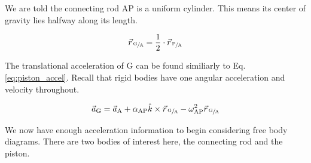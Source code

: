 \documentclass[nofoot,pdf-a,balance,colorlinks,upint,subscriptcorrection,varvw,mathalfa=cal=boondoxo]{asmeconf}
\begin{document}
    We are told the connecting rod AP is a uniform cylinder. This means its center of gravity lies halfway along its length.

    \begin{equation}
        \vec{r}_{\,\sfrac{\textrm{G}}{\textrm{A}}} = \frac{1}{2}\cdot \vec{r}_{\,\sfrac{\textrm{P}}{\textrm{A}}}
    \end{equation}

    The translational acceleration of G can be found similiarly to Eq. \eqref{eq:piston_accel}. Recall that rigid bodies have one angular acceleration and velocity throughout.

    \begin{equation}
        \vec{a}_{\textrm{G}} = \vec{a}_{\textrm{A}} + \alpha_{\textrm{AP}}\hat{k} \times \vec{r}_{\,\sfrac{\textrm{G}}{\textrm{A}}} - \omega_{\textrm{AP}}^2 \vec{r}_{\,\sfrac{\textrm{G}}{\textrm{A}}}
    \end{equation}

    

    We now have enough acceleration information to begin considering free body diagrams. There are two bodies of interest here, the connecting rod and the piston.



\end{document}

